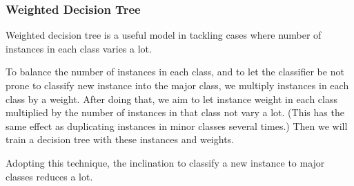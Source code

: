 \documentclass[english]{article}
\begin{document}
\subsubsection{Weighted Decision Tree}
\par Weighted decision tree is a useful model in tackling cases where number of instances in each class varies a lot.
\par To balance the number of instances in each class, and to let the classifier be not prone to classify new instance into the major class, we multiply instances in each class by a weight. After doing that, we aim to let instance weight in each class multiplied by the number of instances in that class not vary a lot. (This has the same effect as duplicating instances in minor classes several times.) Then we will train a decision tree with these instances and weights.
\par Adopting this technique, the inclination to classify a new instance to major classes reduces a lot.
\end{document}
